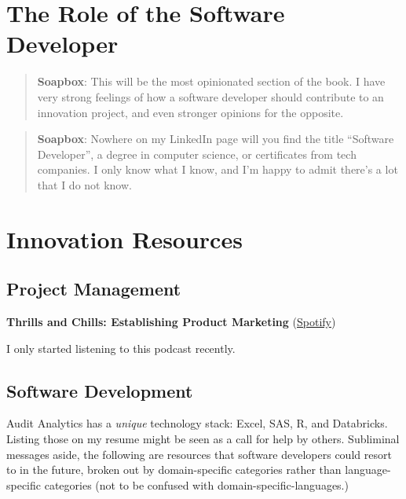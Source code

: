 \documentclass[
]{book}
\theoremstyle{definition}
\theoremstyle{definition}
\theoremstyle{definition}
\theoremstyle{definition}
\theoremstyle{remark}
\begin{document}
\hypertarget{the-role-of-the-software-developer}{%
\section*{The Role of the Software Developer}\label{the-role-of-the-software-developer}}

\begin{quote}
\textbf{Soapbox}: This will be the most opinionated section of the book. I have
very strong feelings of how a software developer should contribute to an
innovation project, and even stronger opinions for the opposite.
\end{quote}

\begin{quote}
\textbf{Soapbox}: Nowhere on my LinkedIn page will you find the title ``Software
Developer'', a degree in computer science, or certificates from tech companies.
I only know what I know, and I'm happy to admit there's a lot that I do not
know.
\end{quote}

\hypertarget{innovation-resources}{%
\section*{Innovation Resources}\label{innovation-resources}}

\hypertarget{project-management}{%
\subsection{Project Management}\label{project-management}}

\textbf{Thrills and Chills: Establishing Product Marketing} (\href{https://open.spotify.com/show/4Q4BBL0eJPvRUMaT2rFOUC}{Spotify})

I only started listening to this podcast recently.

\hypertarget{software-development}{%
\subsection{Software Development}\label{software-development}}

Audit Analytics has a \emph{unique} technology stack: Excel, SAS, R, and Databricks.
Listing those on my resume might be seen as a call for help by others.
Subliminal messages aside, the following are resources that software developers
could resort to in the future, broken out by domain-specific categories rather
than language-specific categories (not to be confused with domain-specific-languages.)
\end{document}
